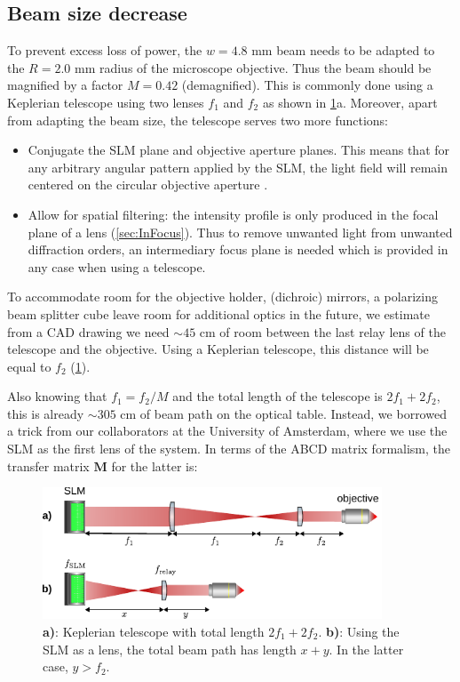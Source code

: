 \subsection{Beam size decrease}

To prevent excess loss of power, the $w = 4.8$ mm beam needs to be adapted to the $R = 2.0$ mm radius of the microscope objective. 
Thus the beam should be magnified by a factor $M=0.42$ (demagnified).
This is commonly done using a Keplerian telescope using two lenses $f_1$ and $f_2$ as shown in \ref{fig:SLMbeampath}a.
Moreover, apart from adapting the beam size, the telescope serves two more functions:

\begin{itemize}
    \item Conjugate the SLM plane and objective aperture planes.
    This means that for any arbitrary angular pattern applied by the SLM, the light field will remain centered on the circular objective aperture \cite{Nogrette2014}. 
    
    \item Allow for spatial filtering: the intensity profile is only produced in the focal plane of a lens (\cref{sec:InFocus}).
    Thus to remove unwanted light from unwanted diffraction orders, an intermediary focus plane is needed which is provided in any case when using a telescope.
\end{itemize}
To accommodate room for the objective holder, (dichroic) mirrors, a polarizing beam splitter cube leave room for additional optics in the future, we estimate from a CAD drawing we need $\sim 45$ cm of room between the last relay lens of the telescope and the objective. 
Using a Keplerian telescope, this distance will be equal to $f_2$ (\cref{fig:SLMbeampath}).

Also knowing that $f_1=f_2/M$ and the total length of the telescope is $2f_1+2f_2$, this is already $\sim 305$ cm of beam path on the optical table. 
Instead, we borrowed a trick from our collaborators at the University of Amsterdam, where we use the SLM as the first lens of the system. 
In terms of the ABCD matrix formalism, the transfer matrix $\mathbf{M}$ for the latter is:

\begin{figure}
	\centering
	\includegraphics[width=0.9\textwidth]{figures/beamPathSLM.pdf}
	\caption{\textbf{a)}: Keplerian telescope with total length $2f_1+2f_2$. \textbf{b)}: Using the SLM as a lens, the total beam path has length $x+y$. In the latter case, $y>f_2$.}
	\label{fig:SLMbeampath}
\end{figure}

